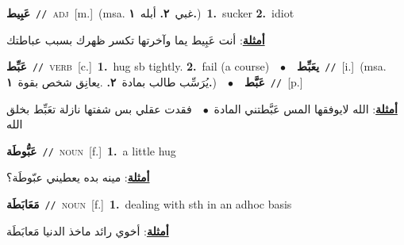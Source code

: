 \documentclass[10pt,a4paper,twoside]{article} %
\begin{document}
\begin{multicols}{2}
{{{{{{{{\setlength\topsep{0pt}\textbf{\foreignlanguage{arabic}{عَبِيط}}\ {\color{gray}\texttt{//}\color{black}}\ \textsc{adj}\ [m.]\ \color{gray}(msa. \foreignlanguage{arabic}{غبي}~\foreignlanguage{arabic}{\textbf{٢.}}  \foreignlanguage{arabic}{أبله}~\foreignlanguage{arabic}{\textbf{١.}})\color{black}\ \textbf{1.}~sucker  \textbf{2.}~idiot\  \begin{flushright}\color{gray}\foreignlanguage{arabic}{\textbf{\underline{\foreignlanguage{arabic}{أمثلة}}}: أنت عَبِيط يما وآخرتها تكسر ظهرك بسبب عباطتك}\end{flushright}\color{black}} \vspace{2mm}

{\setlength\topsep{0pt}\textbf{\foreignlanguage{arabic}{عَبِّط}}\ {\color{gray}\texttt{//}\color{black}}\ \textsc{verb}\ [c.]\ \textbf{1.}~hug sb tightly.  \textbf{2.}~fail (a course)\ \ $\bullet$\ \ \setlength\topsep{0pt}\textbf{\foreignlanguage{arabic}{يعَبِّط}}\ {\color{gray}\texttt{//}\color{black}}\ [i.]\ \color{gray}(msa. \foreignlanguage{arabic}{يُرَسِّب طالب بمادة}~\foreignlanguage{arabic}{\textbf{٢.}}  .\foreignlanguage{arabic}{يعانِق شخص بقوة}~\foreignlanguage{arabic}{\textbf{١.}})\color{black}\ \ $\bullet$\ \ \setlength\topsep{0pt}\textbf{\foreignlanguage{arabic}{عَبَّط}}\ {\color{gray}\texttt{//}\color{black}}\ [p.]\  \begin{flushright}\color{gray}\foreignlanguage{arabic}{\textbf{\underline{\foreignlanguage{arabic}{أمثلة}}}: الله لايوفقها المس عَبَّطتني المادة\ $\bullet$\ \  فقدت عقلي بس شفتها نازلة تعَبِّط بخلق الله}\end{flushright}\color{black}} \vspace{2mm}

{\setlength\topsep{0pt}\textbf{\foreignlanguage{arabic}{عَبُّوطَة}}\ {\color{gray}\texttt{//}\color{black}}\ \textsc{noun}\ [f.]\ \textbf{1.}~a little hug\  \begin{flushright}\color{gray}\foreignlanguage{arabic}{\textbf{\underline{\foreignlanguage{arabic}{أمثلة}}}: مينه بده يعطيني عبّوطَة؟}\end{flushright}\color{black}} \vspace{2mm}

{\setlength\topsep{0pt}\textbf{\foreignlanguage{arabic}{مَعَابَطَة}}\ {\color{gray}\texttt{//}\color{black}}\ \textsc{noun}\ [f.]\ \textbf{1.}~dealing with sth in an adhoc basis\  \begin{flushright}\color{gray}\foreignlanguage{arabic}{\textbf{\underline{\foreignlanguage{arabic}{أمثلة}}}: أخوي رائد ماخذ الدنيا مَعابَطَة}\end{flushright}\color{black}} \vspace{2mm}

}}}}}}}
\end{multicols}
\end{document}
